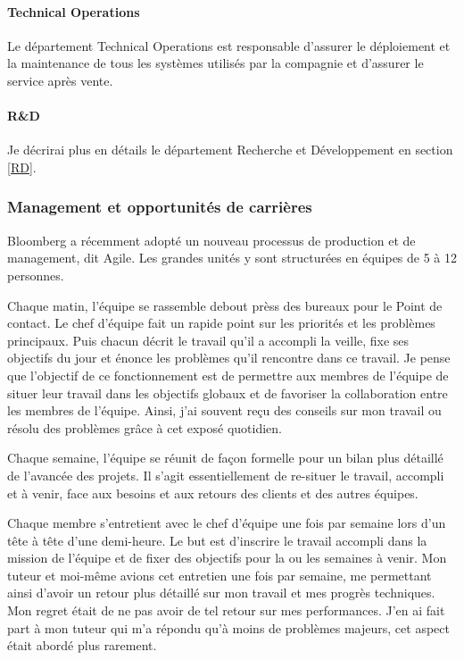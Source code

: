 \documentclass[11pt, oneside, titlepage, a4paper]{article}
\begin{document}
\paragraph{Technical Operations}
Le département Technical Operations est responsable d'assurer le déploiement et la maintenance de tous les systèmes utilisés par la compagnie et d'assurer le \og service après vente\fg{}.
\paragraph{R\&D} Je décrirai plus en détails le département Recherche et Développement en section \ref{RD}.
		\subsubsection{Management et opportunités de carrières}
Bloomberg a récemment adopté un nouveau processus de production et de management, dit \og Agile\fg{}. Les grandes unités y sont structurées en équipes de 5 à 12 personnes.

Chaque matin, l'équipe se rassemble debout prèss des bureaux pour le \og Point de contact\fg{}. Le chef d'équipe fait un rapide point sur les priorités et les problèmes principaux. Puis chacun décrit le travail qu'il a accompli la veille, fixe ses objectifs du jour et énonce les problèmes qu'il rencontre dans ce travail. Je pense que l'objectif de ce fonctionnement est de permettre aux membres de l'équipe de situer leur travail dans les objectifs globaux et de favoriser la collaboration entre les membres de l'équipe. Ainsi, j'ai souvent reçu des conseils sur mon travail ou résolu des problèmes grâce à cet exposé quotidien.

Chaque semaine, l'équipe se réunit de façon formelle pour un bilan plus détaillé de l'avancée des projets. Il s'agit essentiellement de re-situer le travail, accompli et à venir, face aux besoins et aux retours des clients et des autres équipes.

Chaque membre s'entretient avec le chef d'équipe une fois par semaine lors d'un \og tête à tête\fg{} d'une demi-heure. Le but est d'inscrire le travail accompli dans la mission de l'équipe et de fixer des objectifs pour la ou les semaines à venir. Mon tuteur et moi-même avions cet entretien une fois par semaine, me permettant ainsi d'avoir un retour plus détaillé sur mon travail et mes progrès techniques. Mon regret était de ne pas avoir de tel retour sur mes performances. J'en ai fait part à mon tuteur qui m'a répondu qu'à moins de problèmes majeurs, cet aspect était abordé plus rarement.
\end{document}
